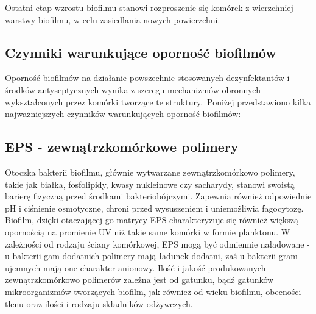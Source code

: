 \documentclass[11pt,a4paper]{report}
\begin{document}
Ostatni etap wzrostu biofilmu stanowi rozproszenie się komórek z wierzchniej warstwy biofilmu, w celu zasiedlania nowych powierzchni\cite{czaczyk}.
\subsection{Czynniki warunkujące oporność biofilmów}

Oporność biofilmów na działanie powszechnie stosowanych dezynfektantów i środków antyseptycznych wynika z szeregu mechanizmów obronnych wykształconych przez komórki tworzące te struktury.\
Poniżej przedstawiono kilka najważniejszych czynników warunkujących oporność biofilmów:

\subsection*{EPS - zewnątrzkomórkowe polimery}

Otoczka bakterii biofilmu, głównie wytwarzane zewnątrzkomórkowo polimery, takie jak białka, fosfolipidy, kwasy nukleinowe czy sacharydy, stanowi swoistą barierę fizyczną przed środkami bakteriobójczymi. Zapewnia również odpowiednie pH i ciśnienie osmotyczne, chroni przed wysuszeniem i uniemożliwia fagocytozę.
Biofilm, dzięki otaczającej go matrycy EPS charakteryzuje się również większą opornością na promienie UV niż takie same komórki w formie planktonu\cite{leginowicz, salek}. 
W zależności od rodzaju ściany komórkowej, EPS mogą być odmiennie naładowane - u bakterii gam-dodatnich polimery mają ładunek dodatni, zaś u bakterii gram-ujemnych mają one charakter anionowy. Ilość i jakość produkowanych zewnątrzkomórkowo polimerów zależna jest od gatunku, bądź gatunków mikroorganizmów tworzących biofilm, jak również od wieku biofilmu, obecności tlenu oraz ilości i rodzaju składników odżywczych\cite{czaczyk-myszka, salek}.



\end{document}
